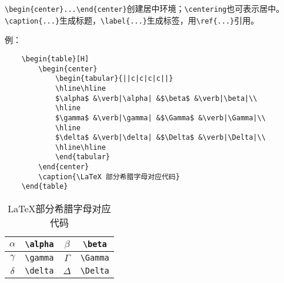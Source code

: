 \documentclass[a4paper,10pt]{ctexart}
\begin{document}
\verb|\begin{center}...\end{center}|创建居中环境；\verb|\centering|也可表示居中。
\verb|\caption{...}|生成标题，\verb|\label{...}|生成标签，用\verb|\ref{...}|引用。


	例：
	\begin{verbatim}
	\begin{table}[H]
		\begin{center}
			\begin{tabular}{||c|c|c|c||}
			\hline\hline
			$\alpha$ &\verb|\alpha| &$\beta$ &\verb|\beta|\\
			\hline
			$\gamma$ &\verb|\gamma| &$\Gamma$ &\verb|\Gamma|\\
			\hline
			$\delta$ &\verb|\delta| &$\Delta$ &\verb|\Delta|\\
			\hline\hline
			\end{tabular}
		\end{center}
		\caption{\LaTeX 部分希腊字母对应代码}
	\end{table}
	\end{verbatim}
	\begin{table}[H]
		\begin{center}
			\begin{tabular}{||c|c|c|c||}
			\hline\hline
			$\alpha$ &\verb|\alpha| &$\beta$ &\verb|\beta|\\
			\hline
			$\gamma$ &\verb|\gamma| &$\Gamma$ &\verb|\Gamma|\\
			\hline
			$\delta$ &\verb|\delta| &$\Delta$ &\verb|\Delta|\\
			\hline\hline
			\end{tabular}
		\end{center}
		\caption{\LaTeX 部分希腊字母对应代码}
	\end{table}
	
\end{document}
